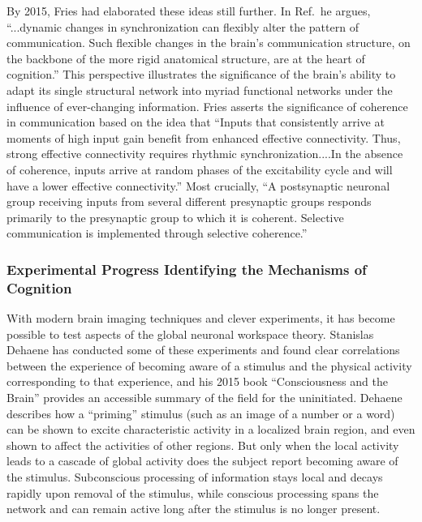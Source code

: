 By 2015, Fries had elaborated these ideas still further. In Ref.\,\cite{fr2015} he argues, ``...dynamic changes in synchronization can flexibly alter the pattern of communication. Such flexible changes in the brain's communication structure, on the backbone of the more rigid anatomical structure, are at the heart of cognition.'' This perspective illustrates the significance of the brain's ability to adapt its single structural network into myriad functional networks under the influence of ever-changing information. Fries asserts the significance of coherence in communication based on the idea that ``Inputs that consistently arrive at moments of high input gain benefit from enhanced effective connectivity. Thus, strong effective connectivity requires rhythmic synchronization....In the absence of coherence, inputs arrive at random phases of the excitability cycle and will have a lower effective connectivity.'' Most crucially, ``A postsynaptic neuronal group receiving inputs from several different presynaptic groups responds primarily to the presynaptic group to which it is coherent. Selective communication is implemented through selective coherence.''

\subsubsection{Experimental Progress Identifying the Mechanisms of Cognition}
With modern brain imaging techniques and clever experiments, it has become possible to test aspects of the global neuronal workspace theory. Stanislas Dehaene has conducted some of these experiments and found clear correlations between the experience of becoming aware of a stimulus and the physical activity corresponding to that experience, and his 2015 book ``Consciousness and the Brain'' provides an accessible summary of the field for the uninitiated. Dehaene describes how a ``priming'' stimulus (such as an image of a number or a word) can be shown to excite characteristic activity in a localized brain region, and even shown to affect the activities of other regions. But only when the local activity leads to a cascade of global activity does the subject report becoming aware of the stimulus. Subconscious processing of information stays local and decays rapidly upon removal of the stimulus, while conscious processing spans the network and can remain active long after the stimulus is no longer present.

